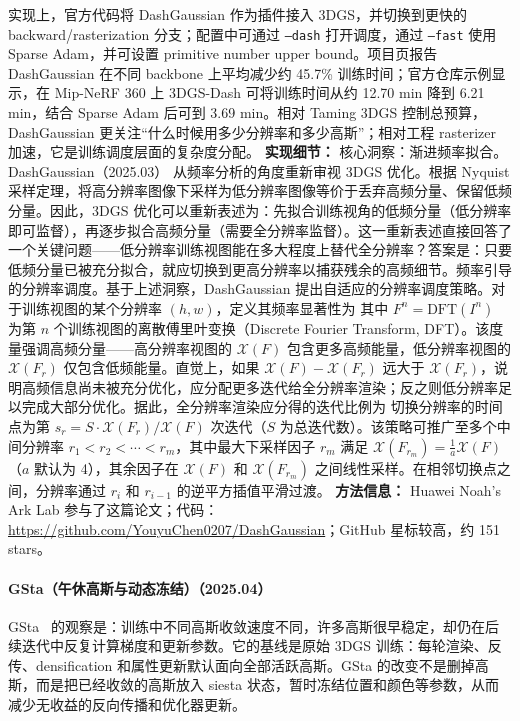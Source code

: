 实现上，官方代码将 DashGaussian 作为插件接入 3DGS，并切换到更快的 backward/rasterization 分支；配置中可通过 \texttt{--dash} 打开调度，通过 \texttt{--fast} 使用 Sparse Adam，并可设置 primitive number upper bound。项目页报告 DashGaussian 在不同 backbone 上平均减少约 45.7\% 训练时间；官方仓库示例显示，在 Mip-NeRF 360 上 3DGS-Dash 可将训练时间从约 12.70 min 降到 6.21 min，结合 Sparse Adam 后可到 3.69 min。相对 Taming 3DGS 控制总预算，DashGaussian 更关注“什么时候用多少分辨率和多少高斯”；相对工程 rasterizer 加速，它是训练调度层面的复杂度分配。
\textbf{实现细节：} 核心洞察：渐进频率拟合。DashGaussian（2025.03） 从频率分析的角度重新审视 3DGS 优化。根据 Nyquist 采样定理，将高分辨率图像下采样为低分辨率图像等价于丢弃高频分量、保留低频分量。因此，3DGS 优化可以重新表述为：先拟合训练视角的低频分量（低分辨率即可监督），再逐步拟合高频分量（需要全分辨率监督）。这一重新表述直接回答了一个关键问题——低分辨率训练视图能在多大程度上替代全分辨率？答案是：只要低频分量已被充分拟合，就应切换到更高分辨率以捕获残余的高频细节。频率引导的分辨率调度。基于上述洞察，DashGaussian 提出自适应的分辨率调度策略。对于训练视图的某个分辨率 $(h, w)$，定义其频率显著性为 其中 $F^n = \mathrm{DFT}(I^n)$ 为第 $n$ 个训练视图的离散傅里叶变换（Discrete Fourier Transform, DFT）。该度量强调高频分量——高分辨率视图的 $\mathcal{X}(F)$ 包含更多高频能量，低分辨率视图的 $\mathcal{X}(F_r)$ 仅包含低频能量。直觉上，如果 $\mathcal{X}(F) - \mathcal{X}(F_r)$ 远大于 $\mathcal{X}(F_r)$，说明高频信息尚未被充分优化，应分配更多迭代给全分辨率渲染；反之则低分辨率足以完成大部分优化。据此，全分辨率渲染应分得的迭代比例为 切换分辨率的时间点为第 $s_r = S \cdot \mathcal{X}(F_r) / \mathcal{X}(F)$ 次迭代（$S$ 为总迭代数）。该策略可推广至多个中间分辨率 $r_1 < r_2 < \cdots < r_m$，其中最大下采样因子 $r_m$ 满足 $\mathcal{X}(F_{r_m}) = \frac{1}{a}\mathcal{X}(F)$（$a$ 默认为 4），其余因子在 $\mathcal{X}(F)$ 和 $\mathcal{X}(F_{r_m})$ 之间线性采样。在相邻切换点之间，分辨率通过 $r_i$ 和 $r_{i-1}$ 的逆平方插值平滑过渡。
\textbf{方法信息：} Huawei Noah's Ark Lab 参与了这篇论文；代码：\url{https://github.com/YouyuChen0207/DashGaussian}；GitHub 星标较高，约 151 stars。



\paragraph{GSta（午休高斯与动态冻结）（2025.04）}
GSta~\cite{2504_06716} 的观察是：训练中不同高斯收敛速度不同，许多高斯很早稳定，却仍在后续迭代中反复计算梯度和更新参数。它的基线是原始 3DGS 训练：每轮渲染、反传、densification 和属性更新默认面向全部活跃高斯。GSta 的改变不是删掉高斯，而是把已经收敛的高斯放入 siesta 状态，暂时冻结位置和颜色等参数，从而减少无收益的反向传播和优化器更新。

